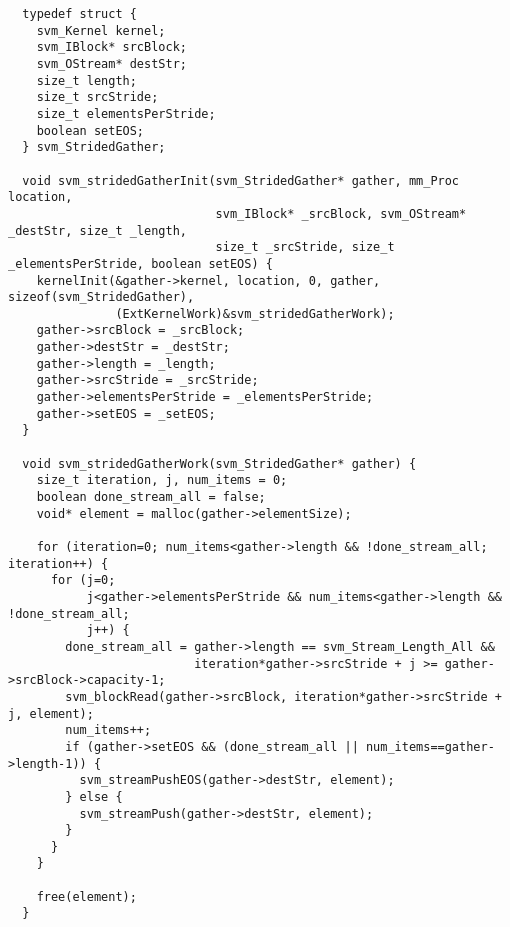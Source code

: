 \clearpage
\makeline
{}
{\small
\begin{verbatim}
  typedef struct {
    svm_Kernel kernel;
    svm_IBlock* srcBlock;
    svm_OStream* destStr;
    size_t length;
    size_t srcStride;
    size_t elementsPerStride;
    boolean setEOS;
  } svm_StridedGather;

  void svm_stridedGatherInit(svm_StridedGather* gather, mm_Proc location, 
                             svm_IBlock* _srcBlock, svm_OStream* _destStr, size_t _length,
                             size_t _srcStride, size_t _elementsPerStride, boolean setEOS) {
    kernelInit(&gather->kernel, location, 0, gather, sizeof(svm_StridedGather), 
               (ExtKernelWork)&svm_stridedGatherWork);
    gather->srcBlock = _srcBlock;
    gather->destStr = _destStr;
    gather->length = _length;
    gather->srcStride = _srcStride;
    gather->elementsPerStride = _elementsPerStride;
    gather->setEOS = _setEOS;
  }

  void svm_stridedGatherWork(svm_StridedGather* gather) {
    size_t iteration, j, num_items = 0;
    boolean done_stream_all = false;
    void* element = malloc(gather->elementSize);

    for (iteration=0; num_items<gather->length && !done_stream_all; iteration++) {
      for (j=0; 
           j<gather->elementsPerStride && num_items<gather->length && !done_stream_all; 
           j++) {
        done_stream_all = gather->length == svm_Stream_Length_All && 
                          iteration*gather->srcStride + j >= gather->srcBlock->capacity-1;
        svm_blockRead(gather->srcBlock, iteration*gather->srcStride + j, element);
        num_items++;
        if (gather->setEOS && (done_stream_all || num_items==gather->length-1)) {
          svm_streamPushEOS(gather->destStr, element);
        } else {
          svm_streamPush(gather->destStr, element);
        }
      }
    }

    free(element);
  }
\end{verbatim}}

